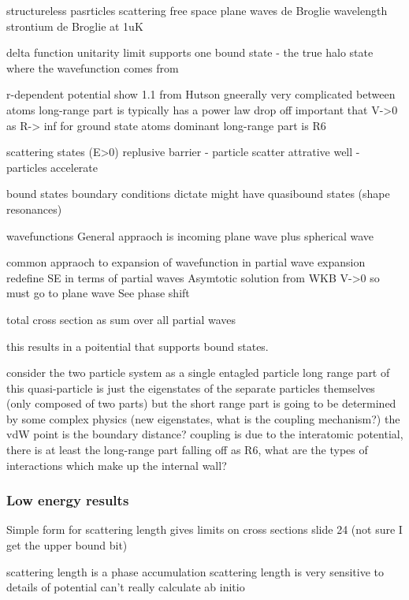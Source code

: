 structureless pasrticles scattering
	free space
		plane waves
		de Broglie wavelength
			strontium de Broglie at 1uK
	
	delta function
		unitarity limit
		supports one bound state - the true halo state
		where the wavefunction comes from

	r-dependent potential
		show 1.1 from Hutson
		gneerally very complicated between atoms
			long-range part is typically has a power law drop off
			important that V->0 as R-> inf
		for ground state atoms dominant long-range part is R6
		
	scattering states (E>0)
		replusive barrier - particle scatter
		attrative well - particles accelerate
		
	bound states
		boundary conditions dictate
		might have quasibound states (shape resonances)
		
	wavefunctions
		General appraoch is incoming plane wave plus spherical wave
			
		common appraoch to expansion of wavefunction in partial wave expansion
			redefine SE in terms of partial waves
				Asymtotic solution from WKB
					V->0 so must go to plane wave
					See phase shift
					
		total cross section as sum over all partial waves

this results in a poitential that supports bound states. 

consider the two particle system as a single entagled particle
	long range part of this quasi-particle is just the eigenstates of the separate particles themselves (only composed of two parts)
	but the short range part is going to be determined by some complex physics (new eigenstates, what is the coupling mechanism?)
		the vdW point is the boundary distance?
		coupling is due to the interatomic potential, there is at least the long-range part falling off as R6, what are the types of interactions which make up the internal wall?

\subsubsection{Low energy results} \label{sssec:sold_single_chan}

Simple form for scattering length
	gives limits on cross sections
	slide 24 (not sure I get the upper bound bit)

scattering length is a phase accumulation
	scattering length is very sensitive to details of potential
		can't really calculate ab initio
		
